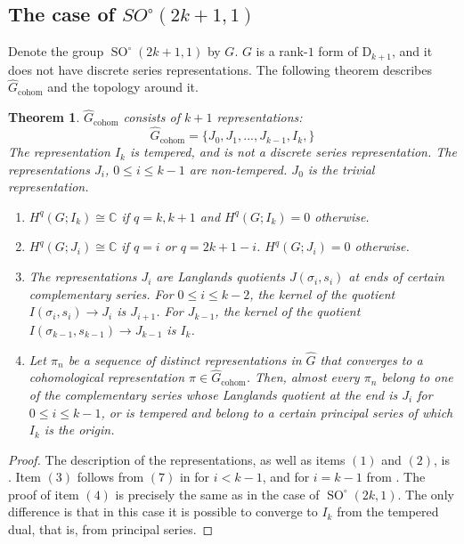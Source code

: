 \documentclass[12pt,reqno]{amsart}
\newtheorem{theorem}{Theorem}[section]
\theoremstyle{definition}
\newcommand{\SO}{\operatorname{SO}}
\begin{document}
\subsection{The case of $SO^\circ(2k+1,1)$}
Denote the group $\SO^\circ(2k+1,1)$ by $G$. $G$ is a rank-$1$ form of $\mathrm{D}_{k+1}$, and it does not have discrete series representations. The following theorem describes $\widehat{G}_\mathrm{cohom}$ and the topology around it. 
\begin{theorem}\label{thm:cohomological dual of SO(2k+1,1)}
    $\widehat{G}_\mathrm{cohom}$ consists of $k+1$ representations:
    \[
    \widehat{G}_\mathrm{cohom}=\{J_0, J_1, ..., J_{k-1},I_k,\}
    \]
    The representation $I_k$ is tempered, and is not a discrete series representation. The representations $J_i$, $0 \leq i \leq k-1$ are non-tempered. $J_0$ is the trivial representation.
    \begin{enumerate}
        \item $H^q(G;I_k) \cong \mathbb{C}$ if $q=k,k+1$ and $H^q(G;I_k) = 0$ otherwise.
        \item $H^q(G;J_i) \cong \mathbb{C}$ if $q=i$ or $q=2k+1 - i$. $H^q(G;J_i)=0$ otherwise.
        \item The representations $J_i$ are Langlands quotients $J(\sigma_i,s_i)$ at ends of certain complementary series. For $0 \leq i \leq k-2$, the kernel of the quotient $I(\sigma_i,s_i) \to J_i$ is $J_{i+1}$. For $J_{k-1}$, the kernel of the quotient $I(\sigma_{k-1},s_{k-1}) \to J_{k-1}$ is $I_k$.
        \item Let $\pi_n$ be a sequence of distinct representations in $\widehat{G}$ that converges to a cohomological representation $\pi \in \widehat{G}_{\mathrm{cohom}}$. Then, almost every $\pi_n$ belong to one of the complementary series whose Langlands quotient at the end is $J_i$ for $0 \leq i \leq k-1$, or is tempered and belong to a certain principal series of which $I_k$ is the origin. 
    \end{enumerate}
\end{theorem}
\begin{proof}
    The description of the representations, as well as items $(1)$ and $(2)$, is \cite[Theorem~VI.4.2]{BorelWallach}. Item $(3)$ follows from $(7)$ in \cite[VI.4.2]{BorelWallach} for $i < k-1$, and for $i=k-1$ from \cite[VI.3.8]{BorelWallach}. The proof of item $(4)$ is precisely the same as in the case of $\SO^\circ(2k,1)$. The only difference is that in this case it is possible to converge to $I_k$ from the tempered dual, that is, from principal series. 
\end{proof}
\end{document}
